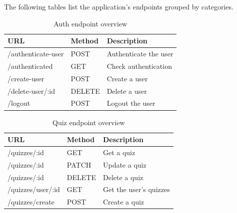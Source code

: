 The following tables list the application's endpoints grouped by categories.

\begin{table}[H]
    \begin{tabular}{|l|l|l|}
        \hline
        \textbf{URL} & \textbf{Method} & \textbf{Description} \\
        \hline
        /authenticate-user & POST & Authenticate the user \\
        /authenticated & GET & Check authentication \\
        /create-user & POST & Create a user \\
        /delete-user/:id & DELETE & Delete a user \\
        /logout & POST & Logout the user \\
        \hline
    \end{tabular}
    \caption{Auth endpoint overview}
    \label{tab:auth-endpoints}
\end{table}

\begin{table}[H]
    \begin{tabular}{|l|l|l|}
        \hline
        \textbf{URL} & \textbf{Method} & \textbf{Description} \\
        \hline
        /quizzes/:id & GET & Get a quiz \\
        /quizzes/:id & PATCH & Update a quiz \\
        /quizzes/:id & DELETE & Delete a quiz \\
        /quizzes/user/:id & GET & Get the user's quizzes \\
        /quizzes/create & POST & Create a quiz \\
        \hline
    \end{tabular}
    \caption{Quiz endpoint overview}
    \label{tab:quiz-endpoints}
\end{table}

